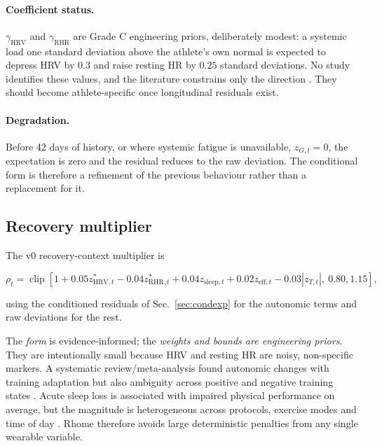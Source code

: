 \documentclass[11pt]{article}
\begin{document}
\paragraph{Coefficient status.} $\gamma_{\mathrm{HRV}}$ and $\gamma_{\mathrm{RHR}}$ are Grade C engineering priors, deliberately modest: a systemic load one standard deviation above the athlete's own normal is expected to depress HRV by $0.3$ and raise resting HR by $0.25$ standard deviations. No study identifies these values, and the literature constrains only the direction \cite{bellenger2016}. They should become athlete-specific once longitudinal residuals exist.

\paragraph{Degradation.} Before 42 days of history, or where systemic fatigue is unavailable, $z_{G,t}=0$, the expectation is zero and the residual reduces to the raw deviation. The conditional form is therefore a refinement of the previous behaviour rather than a replacement for it.

\subsection{Recovery multiplier}

The v0 recovery-context multiplier is

\begin{equation}
\rho_t=\operatorname{clip}\left[
1+0.05z^{\ast}_{\mathrm{HRV},t}
-0.04z^{\ast}_{\mathrm{RHR},t}
+0.04z_{\mathrm{sleep},t}
+0.02z_{\mathrm{eff},t}
-0.03|z_{T,t}|,
\ 0.80,1.15
\right],
\end{equation}

using the conditioned residuals of Sec.~\ref{sec:condexp} for the autonomic terms and raw deviations for the rest.

The \emph{form} is evidence-informed; the \emph{weights and bounds are engineering priors}. They are intentionally small because HRV and resting HR are noisy, non-specific markers. A systematic review/meta-analysis found autonomic changes with training adaptation but also ambiguity across positive and negative training states \cite{bellenger2016}. Acute sleep loss is associated with impaired physical performance on average, but the magnitude is heterogeneous across protocols, exercise modes and time of day \cite{craven2022}. Rhome therefore avoids large deterministic penalties from any single wearable variable.
\end{document}
